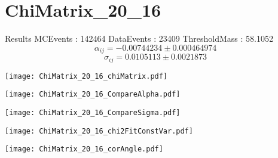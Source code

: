 \documentclass[a4paper,12pt]{article}
\begin{document}
\section{ChiMatrix\_20\_16}
\begin{minipage}{0.49\linewidth} Results \newline
MCEvents : 142464\newline
DataEvents : 23409 \newline
ThresholdMass : 58.1052\\
$$\alpha_{ij} = -0.00744234\pm 0.000464974$$
$$\sigma_{ij} = 0.0105113\pm 0.0021873$$
\end{minipage}\hfill
\begin{minipage}{0.49\linewidth} 
\texttt{[image: ChiMatrix\_20\_16\_chiMatrix.pdf]}\\
\end{minipage}
\hfill
\begin{minipage}{0.49\linewidth} 
\texttt{[image: ChiMatrix\_20\_16\_CompareAlpha.pdf]}\\
\end{minipage}
\hfill
\begin{minipage}{0.49\linewidth} 
\texttt{[image: ChiMatrix\_20\_16\_CompareSigma.pdf]}\\
\end{minipage}
\begin{minipage}{0.49\linewidth} 
\texttt{[image: ChiMatrix\_20\_16\_chi2FitConstVar.pdf]}\\
\end{minipage}
\hfill
\begin{minipage}{0.49\linewidth} 
\texttt{[image: ChiMatrix\_20\_16\_corAngle.pdf]}\\
\end{minipage}
\end{document}
